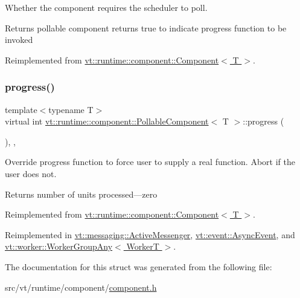 Whether the component requires the scheduler to poll. 

\begin{DoxyReturn}{Returns}
pollable component returns true to indicate progress function to be invoked 
\end{DoxyReturn}


Reimplemented from \hyperlink{structvt_1_1runtime_1_1component_1_1_component_a5a15bd0369a9d3765a6c70249bada96f}{vt\+::runtime\+::component\+::\+Component$<$ T $>$}.

\mbox{\label{structvt_1_1runtime_1_1component_1_1_pollable_component_a34cad810026224d550cd9b0c9d1eff22}} 
\subsubsection{\texorpdfstring{progress()}{progress()}}
{\footnotesize\ttfamily template$<$typename T$>$ \\
virtual int \hyperlink{structvt_1_1runtime_1_1component_1_1_pollable_component}{vt\+::runtime\+::component\+::\+Pollable\+Component}$<$ T $>$\+::progress (\begin{DoxyParamCaption}{ }\end{DoxyParamCaption})\hspace{0.3cm}{\ttfamily [inline]}, {\ttfamily [override]}, {\ttfamily [virtual]}}



Override progress function to force user to supply a real function. Abort if the user does not. 

\begin{DoxyReturn}{Returns}
number of units processed---zero 
\end{DoxyReturn}


Reimplemented from \hyperlink{structvt_1_1runtime_1_1component_1_1_component_a1dab11d9eb5bed8dfd5a3bb8fdf67f5a}{vt\+::runtime\+::component\+::\+Component$<$ T $>$}.



Reimplemented in \hyperlink{structvt_1_1messaging_1_1_active_messenger_a4cd83c125e144ecbd9425fa7cd194538}{vt\+::messaging\+::\+Active\+Messenger}, \hyperlink{structvt_1_1event_1_1_async_event_a36f18429bc2856a30c8f7fd70654e0a4}{vt\+::event\+::\+Async\+Event}, and \hyperlink{structvt_1_1worker_1_1_worker_group_any_a1a2d6dc321514501e00c0373f2583146}{vt\+::worker\+::\+Worker\+Group\+Any$<$ Worker\+T $>$}.



The documentation for this struct was generated from the following file\+:\begin{DoxyCompactItemize}
\item 
src/vt/runtime/component/\hyperlink{component_8h}{component.\+h}\end{DoxyCompactItemize}
